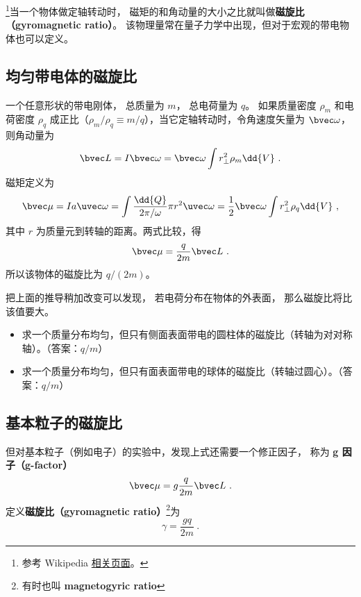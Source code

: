 


\footnote{参考 Wikipedia \href{https://en.wikipedia.org/wiki/Gyromagnetic_ratio}{相关页面}。}当一个物体做定轴转动时， 磁矩的和角动量的大小之比就叫做\textbf{磁旋比（gyromagnetic ratio）}。 该物理量常在量子力学中出现，但对于宏观的带电物体也可以定义。

\subsection{均匀带电体的磁旋比}
一个任意形状的带电刚体， 总质量为 $m$， 总电荷量为 $q$。 如果质量密度 $\rho_m$ 和电荷密度 $\rho_q$ 成正比（$\rho_m/\rho_q \equiv m/q$），当它定轴转动时，令角速度矢量为 $\bvec\omega$， 则角动量为
\begin{equation}
\bvec L = I\bvec \omega  = \bvec \omega \int r_\bot^2 \rho_m \dd{V}~.
\end{equation}
磁矩定义为
\begin{equation}
\bvec \mu  = Ia \uvec\omega = \int \frac{\dd{Q}}{2\pi/\omega}  \pi r^2 \uvec \omega
= \frac12 \bvec \omega \int r_\bot^2\rho_q \dd{V} ~,
\end{equation}
其中 $r$ 为质量元到转轴的距离。两式比较，得
\begin{equation}
\bvec \mu  = \frac{q}{2m} \bvec L~.
\end{equation}
所以该物体的磁旋比为 $q/(2m)$。

把上面的推导稍加改变可以发现， 若电荷分布在物体的外表面， 那么磁旋比将比该值要大。
\begin{exercise}{}
\begin{itemize}
\item 求一个质量分布均匀，但只有侧面表面带电的圆柱体的磁旋比（转轴为对对称轴）。（答案：$q/m$）
\item 求一个质量分布均匀，但只有面表面带电的球体的磁旋比（转轴过圆心）。（答案：$q/m$）
\end{itemize}
\end{exercise}

\subsection{基本粒子的磁旋比}
但对基本粒子（例如电子）的实验中，发现上式还需要一个修正因子， 称为 \textbf{g 因子（g-factor）}
\begin{equation}
\bvec \mu  = g\frac{q}{2m}\bvec L~.
\end{equation}
定义\textbf{磁旋比（gyromagnetic ratio）}\footnote{有时也叫 \textbf{magnetogyric ratio}}为
\begin{equation}
\gamma  = \frac{gq}{2m}~.
\end{equation}


